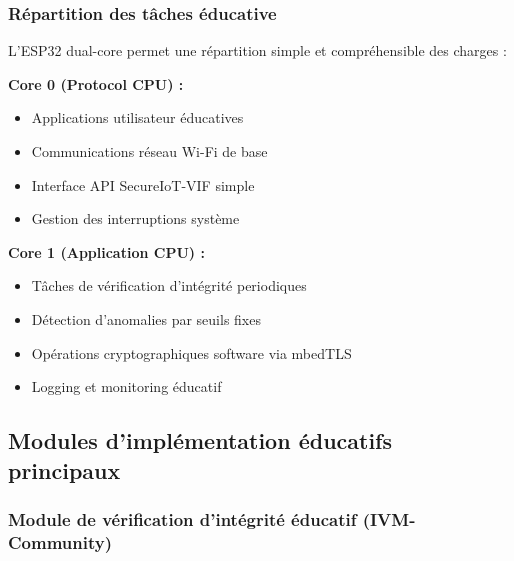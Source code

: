\subsubsection{Répartition des tâches éducative}

L'ESP32 dual-core permet une répartition simple et compréhensible des charges :

\textbf{Core 0 (Protocol CPU) :}
\begin{itemize}
    \item Applications utilisateur éducatives
    \item Communications réseau Wi-Fi de base
    \item Interface API SecureIoT-VIF simple
    \item Gestion des interruptions système
\end{itemize}

\textbf{Core 1 (Application CPU) :}
\begin{itemize}
    \item Tâches de vérification d'intégrité periodiques
    \item Détection d'anomalies par seuils fixes
    \item Opérations cryptographiques software via mbedTLS
    \item Logging et monitoring éducatif
\end{itemize}

\subsection{Modules d'implémentation éducatifs principaux}

\subsubsection{Module de vérification d'intégrité éducatif (IVM-Community)}

